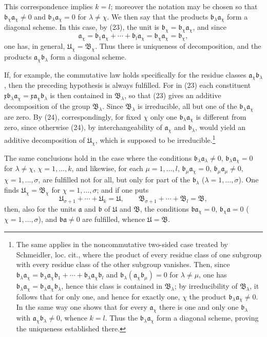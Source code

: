 \documentclass[11pt]{article}
\newcommand{\mB}{\mathfrak{B}}
\newcommand{\ma}{\mathfrak{a}}
\newcommand{\mb}{\mathfrak{b}}
\newcommand{\mx}{\mathfrak{x}}
\providecommand{\mU}{\mathfrak{U}}
\begin{document}
This correspondence implies $k=l$; moreover the notation may be chosen so that $\mb_\chi\ma_\chi\ne0$ and $\mb_\lambda\ma_\chi=0$ for $\lambda\ne\chi$. We then say that the products $\mb_\lambda\ma_\chi$ form a diagonal scheme. In this case, by (23), the unit is $\mb_\chi=\mb_\chi\ma_\chi$, and since
\begin{equation}
 \ma_\chi=\mb_1\ma_\chi+\cdots+\mb_l\ma_\chi=\mb_\chi\ma_\chi=\mb_\chi,
\tag{24}
\end{equation}
one has, in general, $\mU_\chi=\mB_\chi$. Thus there is uniqueness of decomposition, and the products $\ma_\chi\mb_\lambda$ form a diagonal scheme.

If, for example, the commutative law holds specifically for the residue classes $\ma_\chi\mb_\lambda$, then the preceding hypothesis is always fulfilled. For in (23) each constituent $\mx\mb_\lambda\ma_\chi=\mx\ma_\chi\mb_\lambda$ is then contained in $\mB_\lambda$, so that (23) gives an additive decomposition of the group $\mB_\lambda$. Since $\mB_\lambda$ is irreducible, all but one of the $\mb_\lambda\ma_\chi$ are zero. By (24), correspondingly, for fixed $\chi$ only one $\mb_\lambda\ma_\chi$ is different from zero, since otherwise (24), by interchangeability of $\ma_\chi$ and $\mb_\lambda$, would yield an additive decomposition of $\mU_\chi$, which is supposed to be irreducible.\footnote{The same applies in the noncommutative two-sided case treated by Schmeidler, loc. cit., where the product of every residue class of one subgroup with every residue class of the other subgroup vanishes. Then, since $\mb_\lambda\ma_\chi=\mb_\lambda\ma_\chi\mb_1+
\cdots+\mb_\lambda\ma_\chi\mb_l$ and $\mb_\lambda(\ma_\chi\mb_\mu)=0$ for $\lambda\ne\mu$, one has $\mb_\lambda\ma_\chi=\mb_\lambda\ma_\chi\mb_\lambda$, hence this class is contained in $\mB_\lambda$; by irreducibility of $\mB_\lambda$, it follows that for only one, and hence for exactly one, $\chi$ the product $\mb_\lambda\ma_\chi\ne0$. In the same way one shows that for every $\ma_\chi$ there is one and only one $\mb_\lambda$ with $\ma_\chi\mb_\lambda\ne0$, whence $k=l$. Thus the $\mb_\lambda\ma_\chi$ form a diagonal scheme, proving the uniqueness established there.}

The same conclusions hold in the case where the conditions $\mb_\lambda\ma_\lambda\ne0$, $\mb_\lambda\ma_\chi=0$ for $\lambda\ne\chi$, $\chi=1,
\ldots,k$, and likewise, for each $\mu=1,
\ldots,l$, $\mb_\mu\ma_\chi=0$, $\mb_\mu\ma_\mu\ne0$, $\chi=1,
\ldots,\sigma$, are fulfilled not for all, but only for part of the $\mb_\lambda$ ($\lambda=1,
\ldots,\sigma$). One finds $\mU_\chi=\mB_\chi$ for $\chi=1,
\ldots,\sigma$; and if one puts
\[
 \mU_{\sigma+1}+\cdots+\mU_k=\mU,
 \qquad
 \mB_{\sigma+1}+\cdots+\mB_l=\mB,
\]
then, also for the units $\ma$ and $\mb$ of $\mU$ and $\mB$, the conditions $\mb\ma_\chi=0$, $\mb_\chi\ma=0$ ($\chi=1,
\ldots,\sigma$), and $\mb\ma\ne0$ are fulfilled, whence $\mU=\mB$.
\end{document}
